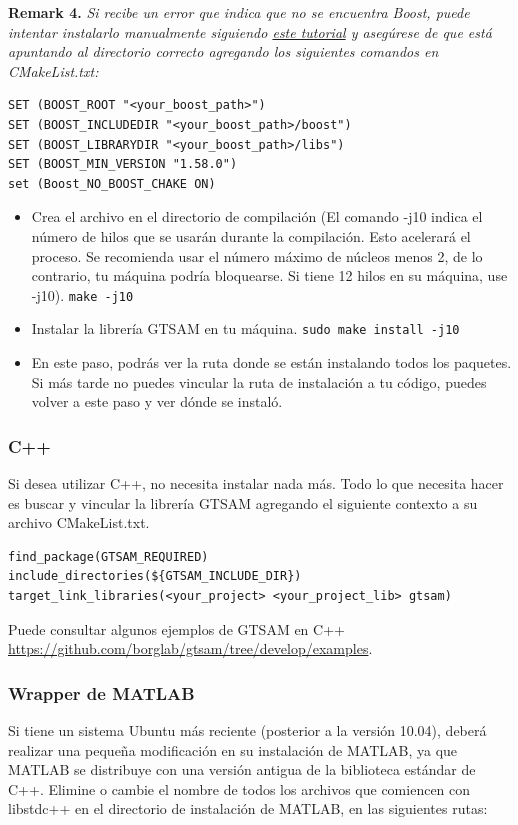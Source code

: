 \documentclass[tp]{lcc}
\begin{document}
\textbf{Remark 4.} \textit{Si recibe un error que indica que no se encuentra Boost, puede intentar instalarlo manualmente siguiendo \href{https://www.boost.org/doc/libs/1_66_0/more/getting_started/unix-variants.html\#get-boost}{este tutorial} y asegúrese de que está apuntando al directorio correcto agregando los siguientes comandos en CMakeList.txt:}

\begin{lstlisting}[style=bash]
SET (BOOST_ROOT "<your_boost_path>")
SET (BOOST_INCLUDEDIR "<your_boost_path>/boost")
SET (BOOST_LIBRARYDIR "<your_boost_path>/libs")
SET (BOOST_MIN_VERSION "1.58.0")
set (Boost_NO_BOOST_CHAKE ON)
\end{lstlisting}

\begin{itemize}
    \item Crea el archivo en el directorio de compilación (El comando -j10 indica el número de hilos que se usarán durante la compilación. Esto acelerará el proceso. Se recomienda usar el número máximo de núcleos menos 2, de lo contrario, tu máquina podría bloquearse. Si tiene 12 hilos en su máquina, use -j10). \lstinline[style=bash]{make -j10}
    \item Instalar la librería GTSAM en tu máquina. \lstinline[style=bash]{sudo make install -j10}
    \item En este paso, podrás ver la ruta donde se están instalando todos los paquetes. Si más tarde no puedes vincular la ruta de instalación a tu código, puedes volver a este paso y ver dónde se instaló.
\end{itemize}

\subsubsection*{C++}
Si desea utilizar C++, no necesita instalar nada más. Todo lo que necesita hacer es buscar y vincular la librería GTSAM agregando el siguiente contexto a su archivo CMakeList.txt.

\begin{lstlisting}[style=cmake]
find_package(GTSAM_REQUIRED)
include_directories(${GTSAM_INCLUDE_DIR})
target_link_libraries(<your_project> <your_project_lib> gtsam)
\end{lstlisting}

Puede consultar algunos ejemplos de GTSAM en C++ \url{https://github.com/borglab/gtsam/tree/develop/examples}.

\subsubsection*{Wrapper de MATLAB}
Si tiene un sistema Ubuntu más reciente (posterior a la versión 10.04), deberá realizar una pequeña modificación en su instalación de MATLAB, ya que MATLAB se distribuye con una versión antigua de la biblioteca estándar de C++. Elimine o cambie el nombre de todos los archivos que comiencen con libstdc++ en el directorio de instalación de MATLAB, en las siguientes rutas:
\end{document}
